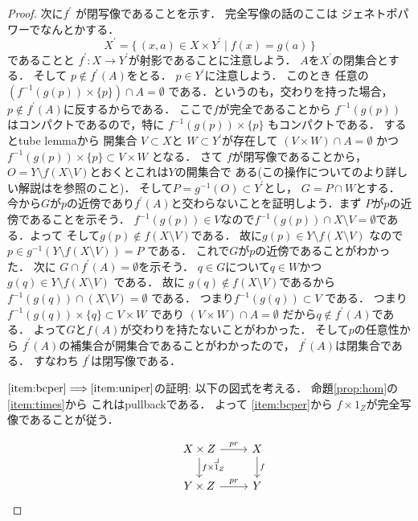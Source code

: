 \documentclass[leqno, a4paper, 12pt, dvipdfmx]{jsarticle}
\newcommand{\To}{\Longrightarrow}
\begin{document}
\begin{proof}
次に$f^{\prime}$
が閉写像であることを示す．
完全写像の話のここは
ジェネトポパワーでなんとかする．
\[
X^{\prime}=\{\, (x, a)\in X\times Y^{\prime}\mid f(x)=g(a)\, \}
\]
であることと
$f^{\prime}\colon X\to Y^{\prime}$が射影であることに注意しよう．
$A$を$X^{\prime}$の閉集合とする．
そして
$p\not \in f^{\prime}(A)$をとる．
$p \in Y^{\prime}$に注意しよう．
このとき
任意の$(f^{-1}(g(p))\times \{p\})\cap A=\emptyset$
である．というのも，交わりを持った場合，
$p\not \in f^{\prime}(A)$に反するからである．
ここで$f$が完全であることから
$f^{-1}(g(p))$はコンパクトであるので，特に
$f^{-1}(g(p))\times \{p\}$
もコンパクトである．
するとtube lemmaから
開集合
$V\subset X$と
$W\subset Y^{\prime}$が存在して
$(V\times W)\cap A=\emptyset$
かつ
$f^{-1}(g(p))\times \{p\}\subset V\times W$
となる．
さて
$f$が閉写像であることから，
$O=Y\setminus f(X\setminus V)$とおくとこれは$Y$の開集合で
ある(この操作についてのより詳しい解説は\cite{dempa3}を参照のこと)．
そして$P=g^{-1}(O)\subset Y^{\prime}$とし，
$G=P\cap W$とする．
今から$G$が$p$の近傍であり$f^{\prime}(A)$と交わらないことを証明しよう．まず
$P$が$p$の近傍であることを示そう．
$f^{-1}(g(p))\in V$なので$f^{-1}(g(p))\cap  X\setminus V=\emptyset$である．よって
そして$g(p)\not \in f(X\setminus V)$である．
故に$g(p)\in Y\setminus f(X\setminus V)$
なので$p\in g^{-1}(Y\setminus f(X\setminus V))=P$
である．
これで$G$が$p$の近傍であることがわかった．
次に
$G\cap f^{\prime}(A)=\emptyset$を示そう．
$q\in G$について$q\in W$かつ
$g(q)\in Y\setminus f(X\setminus V)$
である．
故に
$g(q)\not \in f(X\setminus V)$であるから
$f^{-1}(g(q))\cap (X\setminus V)=\emptyset$
である．
つまり$f^{-1}(g(q))\subset V$
である．
つまり
$f^{-1}(g(q))\times \{q\}\subset V\times W$
であり
$(V\times W)\cap A=\emptyset$
だから$q\not \in f^{\prime}(A)$である．
よって$G$と$f(A)$が交わりを持たないことがわかった．
そして$p$の任意性から
$f^{\prime}(A)$の補集合が開集合であることがわかったので，
$f^{\prime}(A)$は閉集合である．
すなわち
$f^{\prime}$は閉写像である．







$\ref{item:bcper}\To \ref{item:uniper}$の証明:
以下の図式を考える．
命題\ref{prop:hom}の
\ref{item:times}から
これはpullbackである．
よって
\ref{item:bcper}から
$f\times 1_{Z}$が完全写像であることが従う．


\[
\begin{tikzcd}
& X\times Z \arrow[d,"f\times 1_{Z}"]  \arrow[r, "pr"]\arrow[dr, phantom, "\lrcorner", very near start] & X \arrow[d, "f"]\\
& Y\times Z \arrow[r, "pr"]& Y
\end{tikzcd}
\]






\end{proof}
\end{document}
